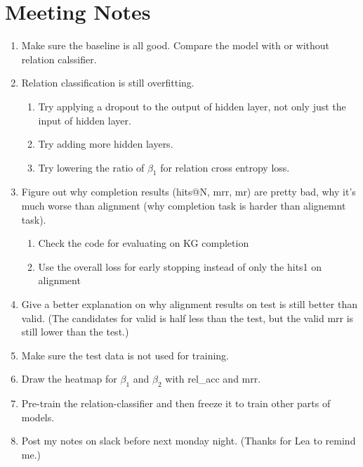 \section{Meeting Notes}
\begin{enumerate}
    \item Make sure the baseline is all good. Compare the model with or without relation calssifier.
    \item Relation classification is still overfitting.
    \begin{enumerate}
        \item \faCheckSquareO Try applying a dropout to the output of hidden layer, not only just the input of hidden layer.
        \item \faCheckSquareO Try adding more hidden layers.
        \item Try lowering the ratio of $\beta_1$ for relation cross entropy loss.  
    \end{enumerate}
    \item Figure out why completion results (hits@N, mrr, mr) are pretty bad, why it's much worse than alignment (why completion task is harder than alignemnt task).
     \begin{enumerate}
        \item \faCheckSquareO Check the code for evaluating on KG completion
        \item \faCheckSquareO Use the overall loss for early stopping instead of only the hits1 on alignment
    \end{enumerate}
    \item Give a better explanation on why alignment results on test is still better than valid. (The candidates for valid is half less than the test, but the valid mrr is still lower than the test.)
    \item \faCheckSquareO Make sure the test data is not used for training.
    \item Draw the heatmap for $\beta_1$ and $\beta_2$ with rel\_acc and mrr.
    \item Pre-train the relation-classifier and then freeze it to train other parts of models. 
    \item Post my notes on slack before next monday night. (Thanks for Lea to remind me.)
\end{enumerate}